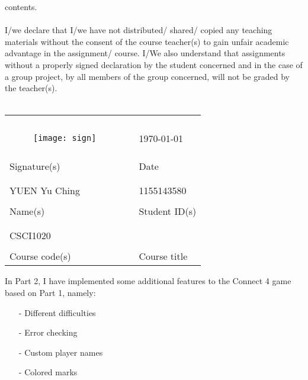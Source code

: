 \documentclass{article}
\newcommand{\hmwkClass}{CSCI1020}
\newcommand{\hmwkClassTime}{}
\newcommand{\hmwkAuthorName}{YUEN Yu Ching}
\newcommand{\hmwkAuthorSID}{1155143580}
\begin{document}
{{{contents.
}\\
\\
I/we declare that I/we have not distributed/ shared/ copied any teaching materials without the consent
of the course teacher(s) to gain unfair academic advantage in the assignment/ course.
I/We also understand that assignments without a properly signed declaration by the student concerned
and in the case of a group project, by all members of the group concerned, will not be graded by the
teacher(s).\\
\\
\begin{tabular}{p{}p{}p{}}
 && \\
 && \\
\begin{minipage}{0.2\textwidth}\begin{figure}[H]\texttt{[image: sign]}\end{figure}\end{minipage} && \today\\
\hrulefill&&\hrulefill\\
Signature(s) && Date\\
 && \\
 && \\
\hmwkAuthorName && \hmwkAuthorSID\\
\hrulefill&&\hrulefill\\
Name(s) && Student ID(s)\\
 && \\
 && \\
\hmwkClass\hmwkClassTime && \\
\hrulefill && \hrulefill\\
Course code(s) && Course title\\
\end{tabular}
}}

\pagebreak
\rhead{\firstxmark}

In Part 2, I have implemented some additional features to the Connect 4 game based on Part 1, namely:
\begin{itemize}
\item[ - ]{Different difficulties}
\item[ - ]{Error checking}
\item[ - ]{Custom player names}
\item[ - ]{Colored marks}
\end{itemize}
\end{document}
